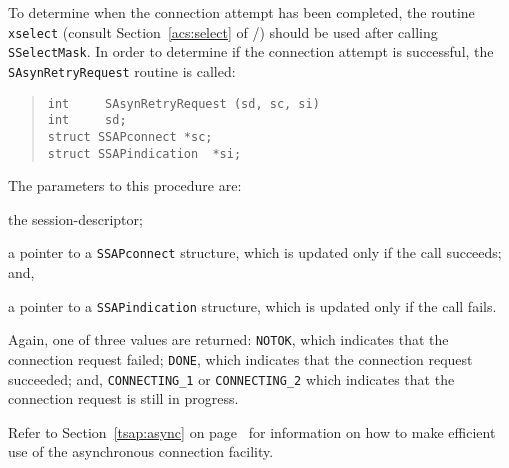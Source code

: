 To determine when the connection attempt has been completed,
the routine \verb"xselect" (consult Section~\ref{acs:select} of \volone/)
should be used after calling \verb"SSelectMask".
In order to determine if the connection attempt is successful,
the \verb"SAsynRetryRequest" routine is called:
\begin{quote}\small\begin{verbatim}
int     SAsynRetryRequest (sd, sc, si)
int     sd;
struct SSAPconnect *sc;
struct SSAPindication  *si;
\end{verbatim}\end{quote}
The parameters to this procedure are:
\begin{describe}
\item[\verb"sd":] the session-descriptor;

\item[\verb"sc":] a pointer to a \verb"SSAPconnect" structure, which is
updated only if the call succeeds;
and,

\item[\verb"si":] a pointer to a \verb"SSAPindication" structure, which is
updated only if the call fails.
\end{describe}
Again, one of three values are returned:
\verb"NOTOK", which indicates that the connection request failed;
\verb"DONE", which indicates that the connection request succeeded;
and, \verb"CONNECTING_1" or \verb"CONNECTING_2" which indicates that
the connection request is still in progress.

Refer to Section~\ref{tsap:async} on page~\pageref{tsap:async} for information
on how to make efficient use of the asynchronous connection facility.

